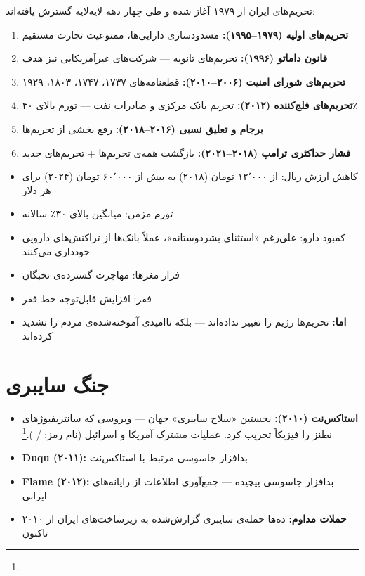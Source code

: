تحریم‌های ایران از ۱۹۷۹ آغاز شده و طی چهار دهه لایه‌لایه گسترش یافته‌اند:

\begin{enumerate}
\item \textbf{تحریم‌های اولیه (۱۹۷۹–۱۹۹۵):} مسدودسازی دارایی‌ها، ممنوعیت تجارت مستقیم
\item \textbf{قانون داماتو (۱۹۹۶):} تحریم‌های ثانویه — شرکت‌های غیرآمریکایی نیز هدف
\item \textbf{تحریم‌های شورای امنیت (۲۰۰۶–۲۰۱۰):} قطعنامه‌های ۱۷۳۷، ۱۷۴۷، ۱۸۰۳، ۱۹۲۹
\item \textbf{تحریم‌های فلج‌کننده (۲۰۱۲):} تحریم بانک مرکزی و صادرات نفت — تورم بالای ۴۰٪
\item \textbf{برجام و تعلیق نسبی (۲۰۱۶–۲۰۱۸):} رفع بخشی از تحریم‌ها
\item \textbf{فشار حداکثری ترامپ (۲۰۱۸–۲۰۲۱):} بازگشت همه‌ی تحریم‌ها + تحریم‌های جدید
\end{enumerate}

\begin{tcolorbox}[enemybox, title={اثر تحریم‌ها بر مردم ایران}]
\begin{itemize}
\item کاهش ارزش ریال: از ۱۲٬۰۰۰ تومان (۲۰۱۸) به بیش از ۶۰٬۰۰۰ تومان (۲۰۲۴) برای هر دلار
\item تورم مزمن: میانگین بالای ۳۰٪ سالانه
\item کمبود دارو: علی‌رغم «استثنای بشردوستانه»، عملاً بانک‌ها از تراکنش‌های دارویی خودداری می‌کنند
\item فرار مغزها: مهاجرت گسترده‌ی نخبگان
\item فقر: افزایش قابل‌توجه خط فقر
\item \textbf{اما:} تحریم‌ها رژیم را تغییر نداده‌اند — بلکه ناامیدی آموخته‌شده‌ی مردم را تشدید کرده‌اند
\end{itemize}
\end{tcolorbox}

\section{جنگ سایبری}
\label{sec:app-c-cyber}

\begin{itemize}
\item \textbf{استاکس‌نت (۲۰۱۰):} نخستین «سلاح سایبری» جهان — ویروسی که سانتریفیوژهای نطنز را فیزیکاً تخریب کرد. عملیات مشترک آمریکا و اسرائیل (نام رمز:  / ).\footnote{}
\item \textbf{Duqu (۲۰۱۱):} بدافزار جاسوسی مرتبط با استاکس‌نت
\item \textbf{Flame (۲۰۱۲):} بدافزار جاسوسی پیچیده — جمع‌آوری اطلاعات از رایانه‌های ایرانی
\item \textbf{حملات مداوم:} ده‌ها حمله‌ی سایبری گزارش‌شده به زیرساخت‌های ایران از ۲۰۱۰ تاکنون
\end{itemize}

